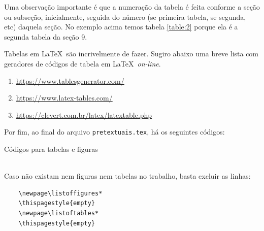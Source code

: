 Uma observação importante é que a numeração da tabela é feita conforme a seção ou subseção, inicialmente, seguida do número (se primeira tabela, se segunda, etc) daquela seção. No exemplo acima temos tabela \ref{table:2} porque ela é a segunda tabela da seção 9.

Tabelas em \LaTeX\ são incrivelmente  de fazer. Sugiro abaixo uma breve lista com geradores de códigos de tabela em \LaTeX\ \textit{on-line}.

\begin{enumerate}
	\item \url{https://www.tablesgenerator.com/}
	\item \url{https://www.latex-tables.com/}
	\item \url{https://clevert.com.br/latex/latextable.php}
\end{enumerate}

Por fim, ao final do arquivo \verb|pretextuais.tex|, há os seguintes códigos:
\ \\
\begin{codex}{Códigos para tabelas e figuras}
	\newpage\tableofcontents*
	\thispagestyle{empty}
	\newpage\listoffigures*
	\thispagestyle{empty}
	\newpage\listoftables*
	\thispagestyle{empty}
\end{codex}
\ \\
Caso não existam nem figuras nem tabelas no trabalho, basta excluir as linhas: 

\begin{verbatim} 
	\newpage\listoffigures*
	\thispagestyle{empty}
	\newpage\listoftables*
	\thispagestyle{empty} 
\end{verbatim}